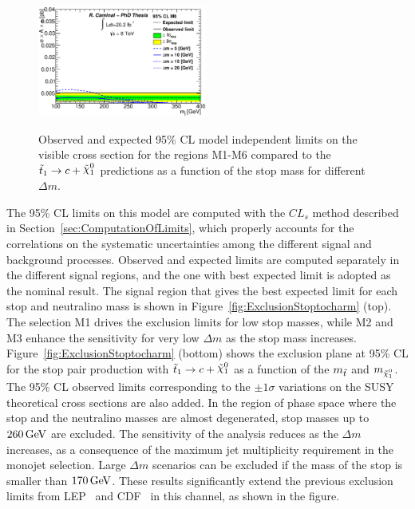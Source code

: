 \begin{figure}[!ht]
\begin{center}
{      \includegraphics[width=0.495\textwidth]{MonojetAnalysis/Figures/ModelIndependent_Stop_M6.eps}
    }
  \end{center}
  \caption[Model independent 95\% CL limits for the different signal regions.]{Observed and expected 95\% CL model independent limits on the visible cross section for the regions M1-M6 compared to the $\stoptocharm$ predictions as a function of the stop mass for different $\Delta m$.}
  \label{fig:modelIndependent}
\end{figure}

The 95\% CL limits on this model are computed with the $CL_s$ method described in Section~\ref{sec:ComputationOfLimits}, which properly accounts for the correlations on the systematic uncertainties among the different signal and background processes.
Observed and expected limits are computed separately in the different signal regions, and the one with best expected limit is adopted as the nominal result.
The signal region that gives the best expected limit for each stop and neutralino mass is shown in Figure~\ref{fig:ExclusionStoptocharm} (top).
The selection M1 drives the exclusion limits for low stop masses, while M2 and M3 enhance the sensitivity for very low $\Delta m$ as the stop mass increases.
Figure~\ref{fig:ExclusionStoptocharm} (bottom) shows the exclusion plane at 95\% CL for the stop pair production with $\stoptocharm$ as a function of the $m_{\tilde{t}}$ and $m_{\ninoone}$.
The 95\% CL observed limits corresponding to the $\pm 1 \sigma$ variations on the SUSY theoretical cross sections are also added.
In the region of phase space where the stop and the neutralino masses are almost degenerated, stop masses up to $\unit[260]{GeV}$ are excluded.
The sensitivity of the analysis reduces as the $\Delta m$ increases, as a consequence of the maximum jet multiplicity requirement in the monojet selection.
Large $\Delta m$ scenarios can be excluded if the mass of the stop is smaller than $\unit[170]{GeV}$.
These results significantly extend the previous exclusion limits from LEP~\cite{Aaltonen:2012tq} and CDF~\cite{Abazov:2008rc} in this channel, as shown in the figure.

